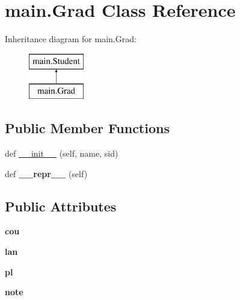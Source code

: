 \hypertarget{classmain_1_1_grad}{}\section{main.\+Grad Class Reference}
\label{classmain_1_1_grad}
Inheritance diagram for main.\+Grad\+:\begin{figure}[H]
\begin{center}
\leavevmode
\includegraphics[height=2.000000cm]{classmain_1_1_grad}
\end{center}
\end{figure}
\subsection*{Public Member Functions}
\begin{DoxyCompactItemize}
\item 
def \hyperlink{classmain_1_1_grad_a3f6aa96bd1cf21f0b5997b766a823448}{\+\_\+\+\_\+init\+\_\+\+\_\+} (self, name, sid)
\item 
\hypertarget{classmain_1_1_grad_a325a69a0de8be8cb30fceab1c3f8c4d3}{}def {\bfseries \+\_\+\+\_\+repr\+\_\+\+\_\+} (self)\label{classmain_1_1_grad_a325a69a0de8be8cb30fceab1c3f8c4d3}

\end{DoxyCompactItemize}
\subsection*{Public Attributes}
\begin{DoxyCompactItemize}
\item 
\hypertarget{classmain_1_1_grad_a7b5d854c511c3adb0b5bc54d113af796}{}{\bfseries cou}\label{classmain_1_1_grad_a7b5d854c511c3adb0b5bc54d113af796}

\item 
\hypertarget{classmain_1_1_grad_a3f75233b7ee3d2f9071d6af45e8ae7e2}{}{\bfseries lan}\label{classmain_1_1_grad_a3f75233b7ee3d2f9071d6af45e8ae7e2}

\item 
\hypertarget{classmain_1_1_grad_acf2607e271077f049d9e98b432350e63}{}{\bfseries pl}\label{classmain_1_1_grad_acf2607e271077f049d9e98b432350e63}

\item 
\hypertarget{classmain_1_1_grad_aa88187797aeb6bd854c8342698378b1d}{}{\bfseries note}\label{classmain_1_1_grad_aa88187797aeb6bd854c8342698378b1d}

\end{DoxyCompactItemize}


